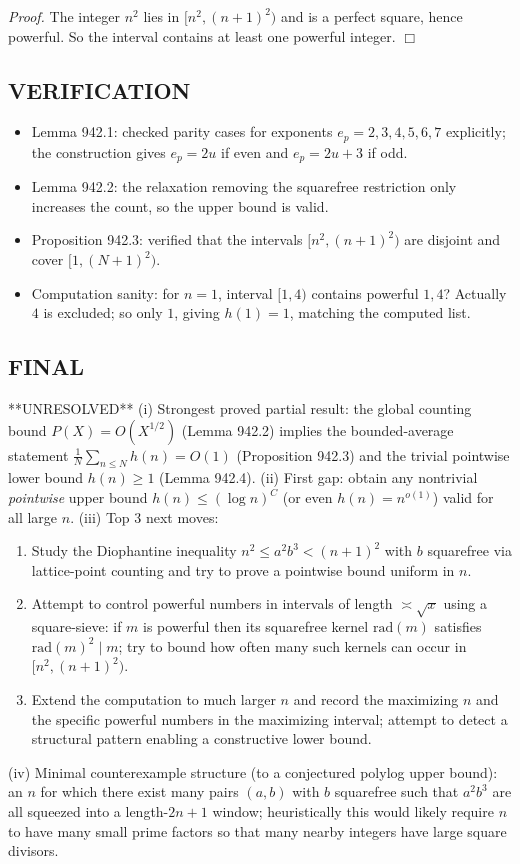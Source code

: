 \emph{Proof.}
The integer $n^2$ lies in $[n^2,(n+1)^2)$ and is a perfect square, hence powerful. So the interval contains at least one powerful integer.
\hfill $\Box$

\subsection*{VERIFICATION}
\begin{itemize}
\item Lemma 942.1: checked parity cases for exponents $e_p=2,3,4,5,6,7$ explicitly; the construction gives $e_p=2u$ if even and $e_p=2u+3$ if odd.
\item Lemma 942.2: the relaxation removing the squarefree restriction only increases the count, so the upper bound is valid.
\item Proposition 942.3: verified that the intervals $[n^2,(n+1)^2)$ are disjoint and cover $[1,(N+1)^2)$.
\item Computation sanity: for $n=1$, interval $[1,4)$ contains powerful $1,4$? Actually $4$ is excluded; so only $1$, giving $h(1)=1$, matching the computed list.
\end{itemize}

\subsection*{FINAL}
**UNRESOLVED**
(i) Strongest proved partial result: the global counting bound $P(X)=O(X^{1/2})$ (Lemma 942.2) implies the bounded-average statement $\frac1N\sum_{n\le N} h(n)=O(1)$ (Proposition 942.3) and the trivial pointwise lower bound $h(n)\ge 1$ (Lemma 942.4).
(ii) First gap: obtain any nontrivial \emph{pointwise} upper bound $h(n)\le (\log n)^{C}$ (or even $h(n)=n^{o(1)}$) valid for all large $n$.
(iii) Top 3 next moves:
\begin{enumerate}
\item Study the Diophantine inequality $n^2\le a^2b^3<(n+1)^2$ with $b$ squarefree via lattice-point counting and try to prove a pointwise bound uniform in $n$.
\item Attempt to control powerful numbers in intervals of length $\asymp \sqrt{x}$ using a square-sieve: if $m$ is powerful then its squarefree kernel $\mathrm{rad}(m)$ satisfies $\mathrm{rad}(m)^2\mid m$; try to bound how often many such kernels can occur in $[n^2,(n+1)^2)$.
\item Extend the computation to much larger $n$ and record the maximizing $n$ and the specific powerful numbers in the maximizing interval; attempt to detect a structural pattern enabling a constructive lower bound.
\end{enumerate}
(iv) Minimal counterexample structure (to a conjectured polylog upper bound): an $n$ for which there exist many pairs $(a,b)$ with $b$ squarefree such that $a^2b^3$ are all squeezed into a length-$2n+1$ window; heuristically this would likely require $n$ to have many small prime factors so that many nearby integers have large square divisors.



